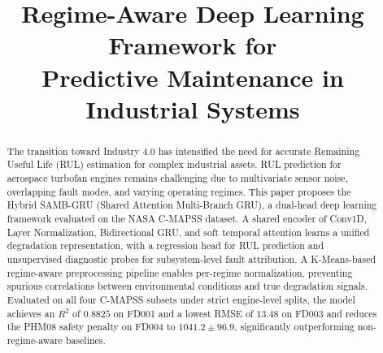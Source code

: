 \documentclass[conference]{IEEEtran}
\begin{document}
\title{Regime-Aware Deep Learning Framework for \\ Predictive Maintenance in Industrial Systems}

\author{
\and
{}
\and
{}
}

\maketitle

\begin{abstract}
The transition toward Industry 4.0 has intensified the need for accurate Remaining Useful Life (RUL) estimation for complex industrial assets. RUL prediction for aerospace turbofan engines remains challenging due to multivariate sensor noise, overlapping fault modes, and varying operating regimes. This paper proposes the Hybrid SAMB-GRU (Shared Attention Multi-Branch GRU), a dual-head deep learning framework evaluated on the NASA C-MAPSS dataset. A shared encoder of Conv1D, Layer Normalization, Bidirectional GRU, and soft temporal attention learns a unified degradation representation, with a regression head for RUL prediction and unsupervised diagnostic probes for subsystem-level fault attribution. A K-Means-based regime-aware preprocessing pipeline enables per-regime normalization, preventing spurious correlations between environmental conditions and true degradation signals. Evaluated on all four C-MAPSS subsets under strict engine-level splits, the model achieves an $R^2$ of $0.8825$ on FD001 and a lowest RMSE of $13.48$ on FD003 and reduces the PHM08 safety penalty on FD004 to $1041.2 \pm 96.9$, significantly outperforming non-regime-aware baselines. 

\end{abstract}
\end{document}
